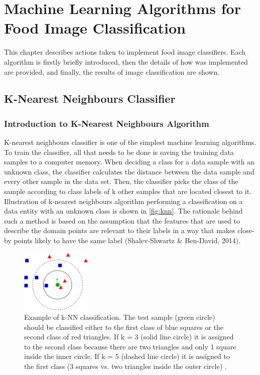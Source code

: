 \chapter{Machine Learning Algorithms for Food Image Classification}
This chapter describes actions taken to implement food image classifiers. Each algorithm is firstly briefly introduced, then the details of how was implemented are provided, and finally, the results of image classification are shown.

\section{K-Nearest Neighbours Classifier}

\subsection{Introduction to K-Nearest Neighbours Algorithm}
K-nearest neighbours classifier is one of the simplest machine learning algorithms. To train the classifier, all that needs to be done is saving the training data samples to a computer memory. When deciding a class for a data sample with an unknown class, the classifier calculates the distance between the data sample and every other sample in the data set. Then, the classifier picks the class of the sample according to class labels of k other samples that are located closest to it. Illustration of k-nearest neighbours algorithm performing a classification on a data entity with an unknown class is shown in \autoref{fig:knn}. The rationale behind such a method is based on the assumption that the features that are used to describe the domain points are relevant to their labels in a way that makes close-by points likely to have the same label (Shalev-Shwartz \& Ben-David, 2014). 


\begin{figure}[h]
\centering
\includegraphics[width=0.3\textwidth]{Figures/knn.png}
\caption{Example of k-NN classification. The test sample (green circle) should be classified either to the first class of blue squares or the second class of red triangles. If k = 3 (solid line circle) it is assigned to the second class because there are two triangles and only 1 square inside the inner circle. If k = 5 (dashed line circle) it is assigned to the first class (3 squares vs. two triangles inside the outer circle) \cite{wikipedia_2017}.}
\label{fig:knn}
\end{figure}


